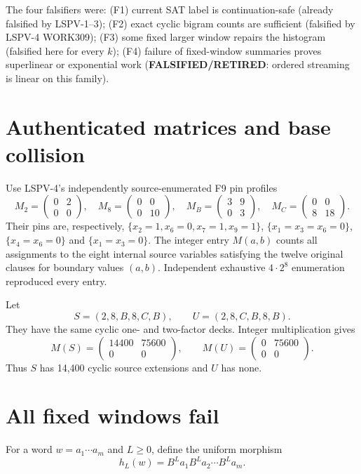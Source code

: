 \documentclass[11pt]{article}
\begin{document}
The four falsifiers were: (F1) current SAT label is continuation-safe
(already falsified by LSPV-1--3); (F2) exact cyclic bigram counts are sufficient
(falsified by LSPV-4 WORK309); (F3) some fixed larger window repairs the histogram
(falsified here for every $k$); (F4) failure of fixed-window summaries proves
superlinear or exponential work (\textbf{FALSIFIED/RETIRED}: ordered streaming is
linear on this family).

\section{Authenticated matrices and base collision}
Use LSPV-4's independently source-enumerated F9 pin profiles
\[
M_2=\begin{pmatrix}0&2\\0&0\end{pmatrix},\quad
M_8=\begin{pmatrix}0&0\\0&10\end{pmatrix},\quad
M_B=\begin{pmatrix}3&9\\0&3\end{pmatrix},\quad
M_C=\begin{pmatrix}0&0\\8&18\end{pmatrix}.
\]
Their pins are, respectively,
$\{x_2=1,x_6=0,x_7=1,x_9=1\}$,
$\{x_1=x_3=x_6=0\}$, $\{x_4=x_6=0\}$ and
$\{x_1=x_3=0\}$.  The integer entry $M(a,b)$ counts all assignments to the
eight internal source variables satisfying the twelve original clauses for
boundary values $(a,b)$.  Independent exhaustive $4\cdot2^8$ enumeration
reproduced every entry.

Let
\[
S=(2,8,B,8,C,B),\qquad U=(2,8,C,B,8,B).
\]
They have the same cyclic one- and two-factor decks.  Integer multiplication gives
\[
M(S)=\begin{pmatrix}14400&75600\\0&0\end{pmatrix},\qquad
M(U)=\begin{pmatrix}0&75600\\0&0\end{pmatrix}.
\]
Thus $S$ has 14,400 cyclic source extensions and $U$ has none.

\section{All fixed windows fail}
For a word $w=a_1\cdots a_m$ and $L\ge0$, define the uniform morphism
\[
h_L(w)=B^L a_1 B^L a_2\cdots B^L a_m.
\]
\end{document}
